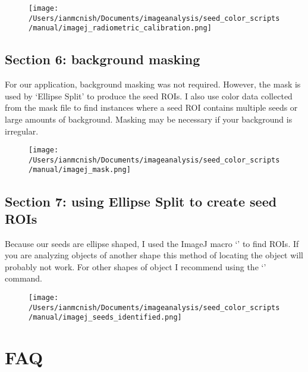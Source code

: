\documentclass[12pt]{article}
\begin{document}
\begin{figure}[H]
	\centering
	\texttt{[image: /Users/ianmcnish/Documents/imageanalysis/seed\_color\_scripts/manual/imagej\_radiometric\_calibration.png]}
	\label{fig:imagej_radiometric_calibration}
\end{figure}

\subsection{Section 6: background masking}\label{sec:imagej_background_masking}

\noindent For our application, background masking was not required. However, the mask is used by `Ellipse Split' to produce the seed ROIs. I also use color data collected from the mask file to find instances where a seed ROI contains multiple seeds or large amounts of background. Masking may be necessary if your background is irregular.\\

\begin{figure}[H]
	\centering
	\texttt{[image: /Users/ianmcnish/Documents/imageanalysis/seed\_color\_scripts/manual/imagej\_mask.png]}
	\label{fig:imagej_mask}
\end{figure}

\subsection{Section 7: using Ellipse Split to create seed ROIs}\label{sec:imagej_ellipse_split}

\noindent Because our seeds are ellipse shaped, I used the ImageJ macro `' to find ROIs. If you are analyzing objects of another shape this method of locating the object will probably not work. For other shapes of object I recommend using the `'  command.\\

\begin{figure}[H]
	\centering
	\texttt{[image: /Users/ianmcnish/Documents/imageanalysis/seed\_color\_scripts/manual/imagej\_seeds\_identified.png]}
	\label{fig:imagej_seeds_identified}
\end{figure}

\section{FAQ}\label{sec:faq}
\end{document}
